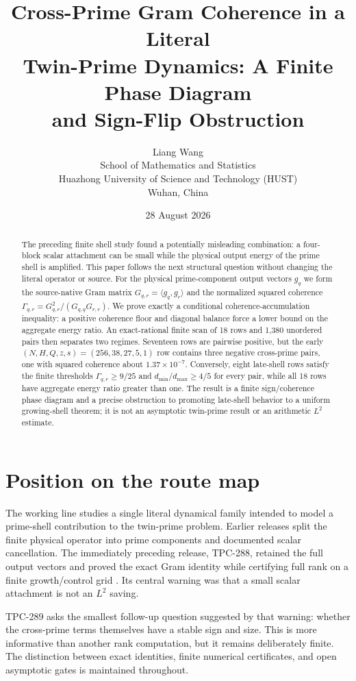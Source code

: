 \documentclass[10pt]{article}
\title{Cross-Prime Gram Coherence in a Literal\\
Twin-Prime Dynamics: A Finite Phase Diagram\\
and Sign-Flip Obstruction}
\author{Liang Wang\\
School of Mathematics and Statistics\\
Huazhong University of Science and Technology (HUST)\\
Wuhan, China}
\date{28 August 2026}
\begin{document}
\maketitle

\begin{abstract}
The preceding finite shell study found a potentially misleading combination:
a four-block scalar attachment can be small while the physical output energy
of the prime shell is amplified.  This paper follows the next structural
question without changing the literal operator or source.  For the physical
prime-component output vectors $g_q$ we form the source-native Gram matrix
$G_{q,r}=\langle g_q,g_r\rangle$ and the normalized squared coherence
$\Gamma_{q,r}=G_{q,r}^2/(G_{q,q}G_{r,r})$.  We prove exactly a conditional
coherence-accumulation inequality: a positive coherence floor and diagonal
balance force a lower bound on the aggregate energy ratio.  An exact-rational
finite scan of 18 rows and 1,380 unordered pairs then separates two regimes.
Seventeen rows are pairwise positive, but the early $(N,H,Q,z,s)=(256,38,27,5,1)$
row contains three negative cross-prime pairs, one with squared coherence about
$1.37\times 10^{-7}$.  Conversely, eight late-shell rows satisfy the finite
thresholds $\Gamma_{q,r}\ge 9/25$ and $d_{\min}/d_{\max}\ge4/5$ for every pair,
while all 18 rows have aggregate energy ratio greater than one.  The result is
a finite sign/coherence phase diagram and a precise obstruction to promoting
late-shell behavior to a uniform growing-shell theorem; it is not an
asymptotic twin-prime result or an arithmetic $L^2$ estimate.
\end{abstract}

\section{Position on the route map}

The working line studies a single literal dynamical family intended to model a
prime-shell contribution to the twin-prime problem.  Earlier releases split
the finite physical operator into prime components and documented scalar
cancellation.  The immediately preceding release, TPC-288, retained the full
output vectors and proved the exact Gram identity while certifying full rank on
a finite growth/control grid \cite{tpc288}.  Its central warning was that a
small scalar attachment is not an $L^2$ saving.

TPC-289 asks the smallest follow-up question suggested by that warning:
whether the cross-prime terms themselves have a stable sign and size.  This is
more informative than another rank computation, but it remains deliberately
finite.  The distinction between exact identities, finite numerical
certificates, and open asymptotic gates is maintained throughout.
\end{document}
